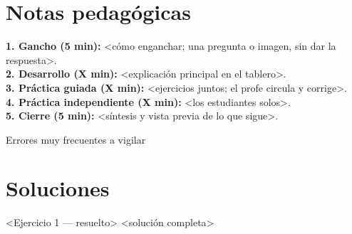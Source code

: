 

\renewcommand{\hdrcapitulo}{<Asignatura> · <Grado> · Guía del Profe}
\renewcommand{\docgrado}{<Grado>}
\renewcommand{\docasignatura}{<Asignatura>}
\renewcommand{\doctipo}{GUÍA DEL PROFESOR}
\renewcommand{\doctitulo}{<Tema>}
\renewcommand{\docsubtitulo}{Secuencia de clase · Errores comunes · Soluciones}
\renewcommand{\docperiodo}{<Período>}



\section{Notas pedagógicas}

\begin{nota}
\textbf{1. Gancho (5 min):} <cómo enganchar; una pregunta o imagen, sin dar la respuesta>.\\
\textbf{2. Desarrollo (X min):} <explicación principal en el tablero>.\\
\textbf{3. Práctica guiada (X min):} <ejercicios juntos; el profe circula y corrige>.\\
\textbf{4. Práctica independiente (X min):} <los estudiantes solos>.\\
\textbf{5. Cierre (5 min):} <síntesis y vista previa de lo que sigue>.
\end{nota}

\begin{alerta}{Errores muy frecuentes a vigilar}
\end{alerta}

\section{Soluciones}

\begin{ejemplo}{<Ejercicio 1 — resuelto>}
<solución completa>
\end{ejemplo}


